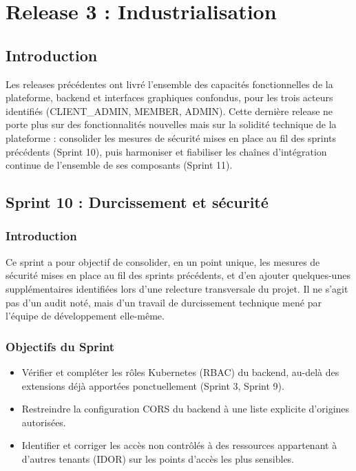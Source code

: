\chapter{Release 3 : Industrialisation}

\section{Introduction}

Les releases précédentes ont livré l'ensemble des capacités fonctionnelles de la plateforme, backend et interfaces graphiques confondus, pour les trois acteurs identifiés (CLIENT\_ADMIN, MEMBER, ADMIN). Cette dernière release ne porte plus sur des fonctionnalités nouvelles mais sur la solidité technique de la plateforme : consolider les mesures de sécurité mises en place au fil des sprints précédents (Sprint 10), puis harmoniser et fiabiliser les chaînes d'intégration continue de l'ensemble de ses composants (Sprint 11).

\section{Sprint 10 : Durcissement et sécurité}

\subsection{Introduction}

Ce sprint a pour objectif de consolider, en un point unique, les mesures de sécurité mises en place au fil des sprints précédents, et d'en ajouter quelques-unes supplémentaires identifiées lors d'une relecture transversale du projet. Il ne s'agit pas d'un audit noté, mais d'un travail de durcissement technique mené par l'équipe de développement elle-même.

\subsection{Objectifs du Sprint}

\begin{itemize}
    \item Vérifier et compléter les rôles Kubernetes (RBAC) du backend, au-delà des extensions déjà apportées ponctuellement (Sprint 3, Sprint 9).
    \item Restreindre la configuration CORS du backend à une liste explicite d'origines autorisées.
    \item Identifier et corriger les accès non contrôlés à des ressources appartenant à d'autres tenants (IDOR) sur les points d'accès les plus sensibles.

\end{itemize}
